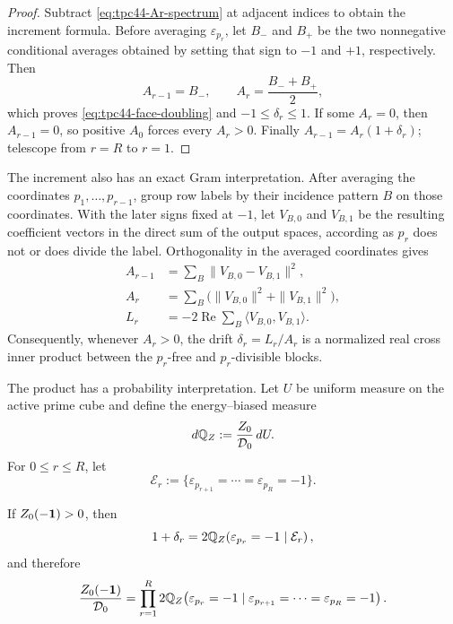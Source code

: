 \begin{proof}
Subtract \eqref{eq:tpc44-Ar-spectrum} at adjacent indices to obtain the
increment formula.  Before averaging \(\varepsilon_{p_r}\), let \(B_-\)
and \(B_+\) be the two nonnegative conditional averages obtained by
setting that sign to \(-1\) and \(+1\), respectively.  Then
\begin{equation}
 A_{r-1}=B_-,
 \qquad A_r=\frac{B_-+B_+}{2},
 \label{eq:tpc44-two-face-average}
\end{equation}
which proves \eqref{eq:tpc44-face-doubling} and
\(-1\le\delta_r\le1\).  If some \(A_r=0\), then \(A_{r-1}=0\), so
positive \(A_0\) forces every \(A_r>0\).  Finally
\(
 A_{r-1}=A_r(1+\delta_r)
\); telescope from \(r=R\) to \(r=1\).
\end{proof}

The increment also has an exact Gram interpretation.  After averaging
the coordinates \(p_1,\ldots,p_{r-1}\), group row labels by their
incidence pattern \(B\) on those coordinates.  With the later signs fixed
at \(-1\), let \(V_{B,0}\) and \(V_{B,1}\) be the resulting coefficient
vectors in the direct sum of the output spaces, according as \(p_r\)
does not or does divide the label.  Orthogonality in the averaged
coordinates gives
\begin{align}
 A_{r-1}
 &=\sum_B\|V_{B,0}-V_{B,1}\|^2,
 \label{eq:tpc44-Gram-face-minus}\\
 A_r
 &=\sum_B\bigl(\|V_{B,0}\|^2+\|V_{B,1}\|^2\bigr),
 \label{eq:tpc44-Gram-face-average}\\
 L_r
 &=-2\operatorname{Re}\sum_B
   \langle V_{B,0},V_{B,1}\rangle.
 \label{eq:tpc44-Gram-face-increment}
\end{align}
Consequently, whenever \(A_r>0\), the drift \(\delta_r=L_r/A_r\) is a
normalized real cross inner product between the \(p_r\)-free and
\(p_r\)-divisible blocks.

The product has a probability interpretation.  Let \(U\) be uniform
measure on the active prime cube and define the energy--biased measure
\begin{equation}
 d\mathbb Q_Z:=\frac{Z_0}{\mathcal D_0}\,dU.
 \label{eq:tpc44-energy-biased-measure}
\end{equation}
For \(0\le r\le R\), let
\begin{equation}
 \mathcal E_r:=
 \{\varepsilon_{p_{r+1}}=\cdots=\varepsilon_{p_R}=-1\}.
 \label{eq:tpc44-tail-face-event}
\end{equation}

\begin{theorem}
\label{thm:tpc44-likelihood-chain}
If \(Z_0(-\mathbf 1)>0\), then
\begin{equation}
 1+\delta_r
 =2\mathbb Q_Z\!\left(
 \varepsilon_{p_r}=-1\mid\mathcal E_r
 \right),
 \label{eq:tpc44-conditional-likelihood}
\end{equation}
and therefore
\begin{equation}
 \frac{Z_0(-\mathbf 1)}{\mathcal D_0}
 =\prod_{r=1}^{R}
 2\mathbb Q_Z\!\left(
 \varepsilon_{p_r}=-1
 \mid
 \varepsilon_{p_{r+1}}=\cdots=\varepsilon_{p_R}=-1
 \right).
 \label{eq:tpc44-likelihood-product}
\end{equation}
\end{theorem}


